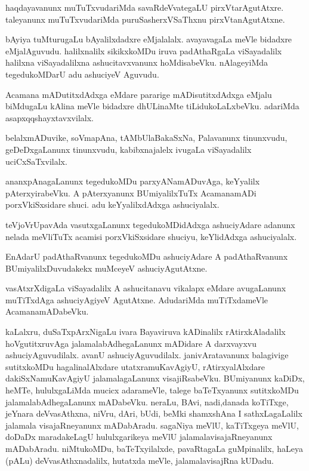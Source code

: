 \documentclass{article}
\begin{document}
\begin{mn}
haqdayavanunx muTuTxvudariMda savaRdeVvategaLU pirxVtarAgutAtxre. taleyanunx muTuTxvudariMda 
puruSasherxVSaThxnu pirxVtanAgutAtxne.
\end{mn}

\begin{mn}
bAyiya tuMturugaLu bAyalilxdadxre eMjalalalx. avayavagaLa meVle bidadxre eMjalAguvudu. 
halilxnalilx sikikxkoMDu iruva padAthaRgaLa viSayadalilx halilxna viSayadalilxna ashucitavxvanunx 
hoMdisabeVku. nAlageyiMda tegedukoMDarU adu ashuciyeV Aguvudu.
\end{mn}

\begin{mn}
Acamana mADutitxdAdxga eMdare pararige mADisutitxdAdxga eMjalu biMdugaLu kAlina meVle bidadxre 
dhULinaMte tiLidukoLaLxbeVku. adariMda asapxqqshayxtavxvilalx.
\end{mn}

\begin{mn}
belalxmADuvike, soVmapAna, tAMbUlaBakaSxNa, Palavanunx tinunxvudu, geDeDxgaLanunx tinunxvudu, 
kabibxnajalelx ivugaLa viSayadalilx uciCxSaTxvilalx.
\end{mn}

\begin{mn}
ananxpAnagaLanunx tegedukoMDu parxyANamADuvAga, keYyalilx pAterxyirabeVku. A pAterxyanunx 
BUmiyalilxTuTx AcamanamADi porxVkiSxsidare shuci. adu keYyalilxdAdxga ashuciyalalx.
\end{mn}

\begin{mn}
teVjoVrUpavAda vasutxgaLanunx tegedukoMDidAdxga ashuciyAdare adanunx nelada meVliTuTx acamisi 
porxVkiSxsidare shuciyu, keYlidAdxga ashuciyalalx.
\end{mn}

\begin{mn}
EnAdarU padAthaRvanunx tegedukoMDu ashuciyAdare A padAthaRvanunx BUmiyalilxDuvudakekx muMceyeV 
ashuciyAgutAtxne.
\end{mn}

\begin{mn}
vasAtxrXdigaLa viSayadalilx A ashucitanavu vikalapx eMdare avugaLanunx muTiTxdAga ashuciyAgiyeV 
AgutAtxne. AdudariMda muTiTxdameVle AcamanamADabeVku.
\end{mn}

\begin{mn}
kaLalxru, duSaTxpArxNigaLu ivara Bayaviruva kADinalilx rAtirxkAladalilx hoVgutitxruvAga 
jalamalabAdhegaLanunx mADidare A darxvayxvu ashuciyAguvudilalx. avanU ashuciyAguvudilalx. 
janivAratavanunx balagivige sutitxkoMDu hagalinalAlxdare utatxramuKavAgiyU, rAtirxyalAlxdare 
dakiSxNamuKavAgiyU jalamalagaLanunx visajiRsabeVku. BUmiyanunx kaDiDx, heMTe, hululxgaLiMda mucicx 
adarameVle, talege baTeTxyanunx sutitxkoMDu jalamalabAdhegaLanunx mADabeVku. neraLu, BAvi, 
nadi,danada koTiTxge, jeYnara deVvasAthxna, niVru, dAri, bUdi, beMki shamxshAna I 
sathxLagaLalilx jalamala visajaRneyanunx mADabAradu. sagaNiya meVlU, kaTiTxgeya meVlU, doDaDx 
maradakeLagU hululxgarikeya meVlU jalamalavisajaRneyanunx mADabAradu. niMtukoMDu, 
baTeTxyilalxde, pavaRtagaLa guMpinalilx, haLeya (pALu) deVvasAthxnadalilx, hutatxda meVle, 
jalamalavisajRna kUDadu. 
\end{mn}
\end{document}
